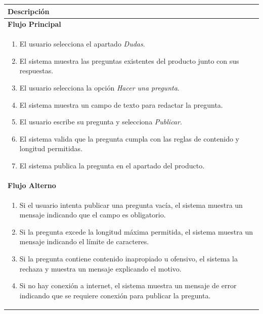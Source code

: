 \begin{table}[H]
\centering
\begin{tabular}{p{15.5cm}}\toprule \textbf{Descripción} \\
\midrule
\textbf{Flujo Principal} \\[2pt]
\begin{enumerate}
\item El usuario selecciona el apartado \textit{Dudas}.
\item El sistema muestra las preguntas existentes del producto junto con sus
      respuestas.
\item El usuario selecciona la opción \textit{Hacer una pregunta}.
\item El sistema muestra un campo de texto para redactar la pregunta.
\item El usuario escribe su pregunta y selecciona \textit{Publicar}.
\item El sistema valida que la pregunta cumpla con las reglas de contenido y
      longitud permitidas.
\item El sistema publica la pregunta en el apartado del producto.
\end{enumerate} \\
\midrule
\textbf{Flujo Alterno} \\[2pt]
\begin{enumerate}
\item[6a.] Si el usuario intenta publicar una pregunta vacía, el sistema
    muestra un mensaje indicando que el campo es obligatorio.
\item[7a.] Si la pregunta excede la longitud máxima permitida, el sistema
    muestra un mensaje indicando el límite de caracteres.
\item[7b.] Si la pregunta contiene contenido inapropiado u ofensivo, el
    sistema la rechaza y muestra un mensaje explicando el motivo.
\item[8a.] Si no hay conexión a internet, el sistema muestra un mensaje de error
    indicando que se requiere conexión para publicar la pregunta.
\end{enumerate}
\\
\bottomrule
\end{tabular}
\end{table}